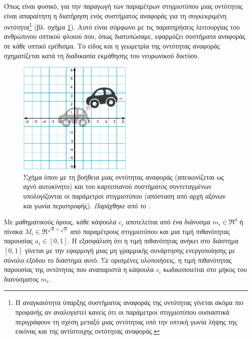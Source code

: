 Όπως είναι φυσικό, για την παραγωγή των παραμέτρων στιγμιοτύπου μιας οντότητας είναι απαραίτητη η διατήρηση ενός συστήματος αναφοράς για τη συγκεκριμένη οντότητα\footnote{Η αναγκαιότητα ύπαρξης συστήματος αναφοράς της οντότητας γίνεται ακόμα πιο προφανής αν αναλογιστεί κανείς ότι οι παράμετροι στιγμιοτύπου ουσιαστικά περιγράφουν τη σχέση μεταξύ μιας οντότητας υπό την οπτική γωνία λήψης της εικόνας και της αντίστοιχης οντότητας αναφοράς.} (βλ. σχήμα \ref{fig:ref_frame}). Αυτό είναι σύμφωνο με τις παρατηρήσεις λειτουργίας του ανθρώπινου οπτικού φλοιού που, όπως διατυπώσαμε, εφαρμόζει συστήματα αναφοράς σε κάθε οπτικό ερέθισμα. Το είδος και η γεωμετρία της οντότητας αναφοράς σχηματίζεται κατά τη διαδικασία εκμάθησης του νευρωνικού δικτύου. \par

\begin{figure}[h]
  \centering
  \includegraphics[width=0.5\textwidth]{images/chapter theoritical background/2D_Cartesian_Coordinates.pdf}
  \caption{Σχήμα όπου με τη βοήθεια μιας οντότητας αναφοράς (απεικονίζεται ως αχνό αυτοκίνητο) και του καρτεσιανού συστήματος συντεταγμένων υπολογίζονται οι παράμετροι στιγμιοτύπου (απόσταση από αρχή αξόνων και γωνία περιστροφής). \textit{Παράχθηκε από το \href{https://inkscape.org/}{}}.}
  \label{fig:ref_frame}
\end{figure}

Με μαθηματικούς όρους, κάθε κάψουλα $c_i$ αποτελείται από ένα διάνυσμα $m_i \in \Re^d$ ή πίνακα $M_i \in \Re^{\surd{d}\times\surd{d}}$ από παραμέτρους στιγμιοτύπου και μια τιμή πιθανότητας παρουσίας $a_i \in [0,1]$. Η εξασφάλιση ότι η τιμή πιθανότητας ανήκει στο διάστημα $[0,1]$ γίνεται με την εφαρμογή μιας μη γραμμικής συνάρτησης ενεργοποίησης με σύνολο εξόδου το διάστημα αυτό. Σε ορισμένες υλοποιήσεις, η τιμή πιθανότητας παρουσίας της οντότητας που αναπαριστά η κάψουλα $c_i$ κωδικοποιείται στο μήκος του διανύσματος $m_i$.\par

